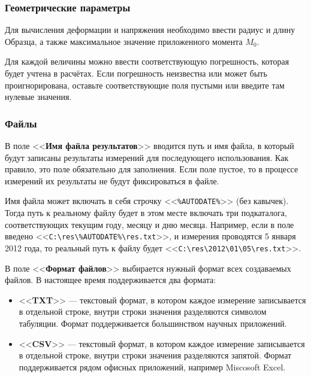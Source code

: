 \documentclass[12pt, a4paper, twocolumn]{report}
\newcommand{\CTL}[1]{<<{\bf #1}>>}
\newcommand{\CMD}[1]{<<{\tt #1}>>}
\begin{document}
\subsubsection{Геометрические параметры}
\label{sec_geom_params}

Для вычисления деформации и напряжения необходимо ввести радиус и длину Образца, а также максимальное значение приложенного момента $M_0$.

Для каждой величины можно ввести соответствующую погрешность, которая будет учтена в расчётах. Если погрешность неизвестна или может быть проигнорирована, оставьте соответствующие поля пустыми или введите там нулевые значения.

\subsubsection{Файлы}

В поле \CTL{Имя файла результатов} вводится путь и имя файла, в который будут записаны результаты измерений для последующего использования. Как правило, это поле обязательно для заполнения. Если поле пустое, то в процессе измерений их результаты не будут фиксироваться в файле.

Имя файла может включать в себя строчку \CMD{\%AUTODATE\%} (без кавычек). Тогда путь к реальному файлу будет в этом месте включать три
 подкаталога, соответствующих текущим году, месяцу и дню месяца. Например, если в поле введено \CMD{C:\textbackslash{}res\textbackslash{}\%AUTODATE\%\textbackslash{}res.txt}, и измерения проводятся 5 января 2012 года, то реальный путь к файлу будет \CMD{C:\textbackslash{}res\textbackslash{}2012\textbackslash{}01\textbackslash{}05\textbackslash{}res.txt}.

В поле \CTL{Формат файлов} выбирается нужный формат всех создаваемых файлов. В настоящее время поддерживается два формата:

\begin{itemize}
\item \CTL{TXT} --- текстовый формат, в котором каждое измерение записывается в отдельной строке, внутри строки значения разделяются символом табуляции. Формат поддерживается большинством научных приложений.
\item \CTL{CSV} --- текстовый формат, в котором каждое измерение записывается в отдельной строке, внутри строки значения разделяются запятой. Формат поддерживается рядом офисных приложений, например Miscosoft Excel.
\end{itemize}
\end{document}
